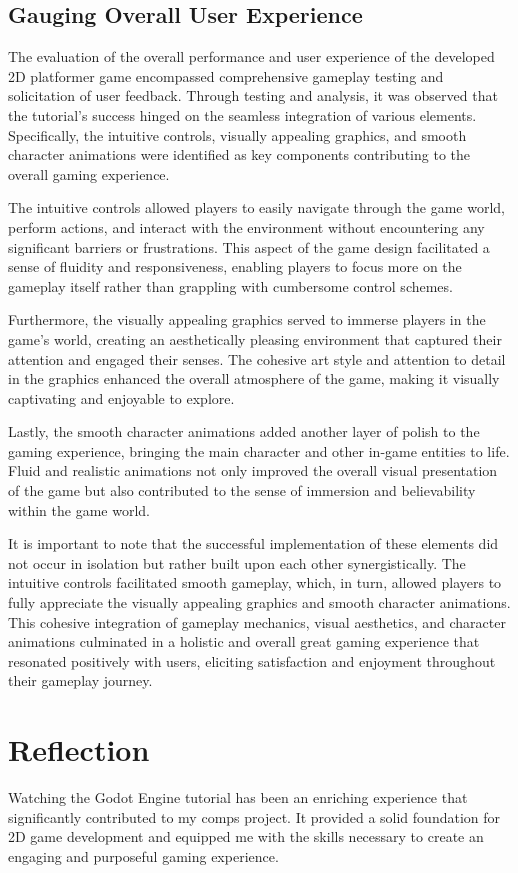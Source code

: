 \documentclass[10pt,twocolumn]{article}
\begin{document}
\subsection{Gauging Overall User Experience}
The evaluation of the overall performance and user experience of the developed 2D platformer game encompassed comprehensive gameplay testing and solicitation of user feedback. Through testing and analysis, it was observed that the tutorial's success hinged on the seamless integration of various elements. Specifically, the intuitive controls, visually appealing graphics, and smooth character animations were identified as key components contributing to the overall gaming experience.

The intuitive controls allowed players to easily navigate through the game world, perform actions, and interact with the environment without encountering any significant barriers or frustrations. This aspect of the game design facilitated a sense of fluidity and responsiveness, enabling players to focus more on the gameplay itself rather than grappling with cumbersome control schemes.

Furthermore, the visually appealing graphics served to immerse players in the game's world, creating an aesthetically pleasing environment that captured their attention and engaged their senses. The cohesive art style and attention to detail in the graphics enhanced the overall atmosphere of the game, making it visually captivating and enjoyable to explore.

Lastly, the smooth character animations added another layer of polish to the gaming experience, bringing the main character and other in-game entities to life. Fluid and realistic animations not only improved the overall visual presentation of the game but also contributed to the sense of immersion and believability within the game world.

It is important to note that the successful implementation of these elements did not occur in isolation but rather built upon each other synergistically. The intuitive controls facilitated smooth gameplay, which, in turn, allowed players to fully appreciate the visually appealing graphics and smooth character animations. This cohesive integration of gameplay mechanics, visual aesthetics, and character animations culminated in a holistic and overall great gaming experience that resonated positively with users, eliciting satisfaction and enjoyment throughout their gameplay journey.


\section{Reflection}
Watching the Godot Engine tutorial has been an enriching experience that significantly contributed to my comps project. It provided a solid foundation for 2D game development and equipped me with the skills necessary to create an engaging and purposeful gaming experience.
\end{document}
